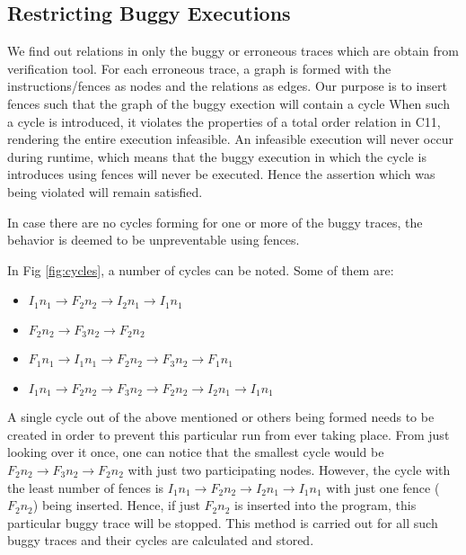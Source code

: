 \subsection{Restricting Buggy Executions}
\par
We find out \setTO relations in only the buggy or erroneous traces which 
are obtain from verification tool. For each erroneous trace, a graph is 
formed with the instructions/fences as nodes and the \setTO relations as 
edges. 
Our purpose is to insert fences such that the graph of the buggy exection 
will contain a cycle 
When such a cycle is introduced, it violates the properties of a total 
order relation in C11, rendering the entire execution infeasible. 
An infeasible execution will never occur during runtime, which means 
that the buggy execution in which the \setTO cycle is introduces using 
fences will never be executed. 
Hence the assertion which was being violated will remain satisfied. 

In case there are no cycles forming for one or more of the buggy traces, 
the behavior is deemed to be unpreventable using \mosc fences. 

\par
In Fig \ref{fig:cycles}, a number of cycles can be noted. Some of them are:
\begin{itemize}
\item \textit{$I_1n_1 \rightarrow F_2n_2 \rightarrow I_2n_1 \rightarrow I_1n_1$}
\item \textit{$F_2n_2 \rightarrow F_3n_2 \rightarrow F_2n_2$}
\item \textit{$F_1n_1 \rightarrow I_1n_1 \rightarrow F_2n_2 \rightarrow F_3n_2 \rightarrow F_1n_1$}
\item \textit{$I_1n_1 \rightarrow F_2n_2 \rightarrow F_3n_2 \rightarrow F_2n_2 \rightarrow I_2n_1 \rightarrow I_1n_1$}
\end{itemize} 
A single cycle out of the above mentioned or others being formed needs 
to be created in order to prevent this particular run from ever taking 
place. From just looking over it once, one can notice that the smallest 
cycle would be \textit{$F_2n_2 \rightarrow F_3n_2 \rightarrow F_2n_2$} 
with just two participating nodes. However, the cycle with the least 
number of fences is \textit{$I_1n_1 \rightarrow F_2n_2 \rightarrow I_2n_1 
\rightarrow I_1n_1$} with just one fence (\textit{$F_2n_2$}) being inserted. 
Hence, if just \textit{$F_2n_2$} is inserted into the program, this particular 
buggy trace will be stopped. This method is carried out for all such 
buggy traces and their cycles are calculated and stored.

